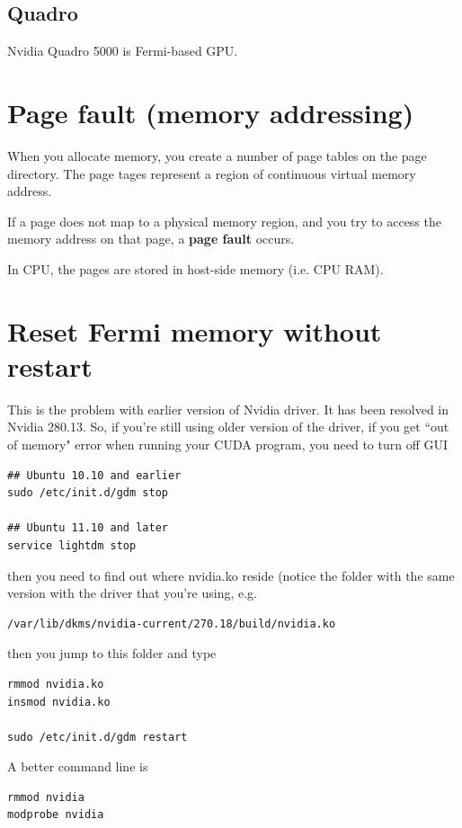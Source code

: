 \subsection{Quadro}
\label{sec:Fermi-based-Quadro}

Nvidia Quadro 5000 is Fermi-based GPU.

\section{Page fault (memory addressing)}
\label{sec:page-fault}

When you allocate memory, you create a number of page tables on the page directory. The page tages
represent a region of continuous virtual memory address. 

If a page does not map to a physical memory region, and you try to access the memory address on that page, a
{\bf page fault} occurs.

In CPU, the pages are stored in host-side memory (i.e. CPU RAM).

\section{Reset Fermi memory without restart}
\label{sec:reset-fermi-memory}

This is the problem with earlier version of Nvidia driver. It has been resolved
in Nvidia 280.13. So, if you're still using older version of the driver, if
you get ``out of memory" error when running your CUDA program, you need to turn
off GUI
\begin{verbatim}
## Ubuntu 10.10 and earlier
sudo /etc/init.d/gdm stop

## Ubuntu 11.10 and later
service lightdm stop
\end{verbatim}
then you need to find out where nvidia.ko reside (notice the folder
with the same version with the driver that you're using, e.g. 
\begin{verbatim}
/var/lib/dkms/nvidia-current/270.18/build/nvidia.ko
\end{verbatim}
then you jump to this folder and type
\begin{verbatim}
rmmod nvidia.ko
insmod nvidia.ko

sudo /etc/init.d/gdm restart
\end{verbatim}
A better command line is
\begin{verbatim}
rmmod nvidia
modprobe nvidia
\end{verbatim}


